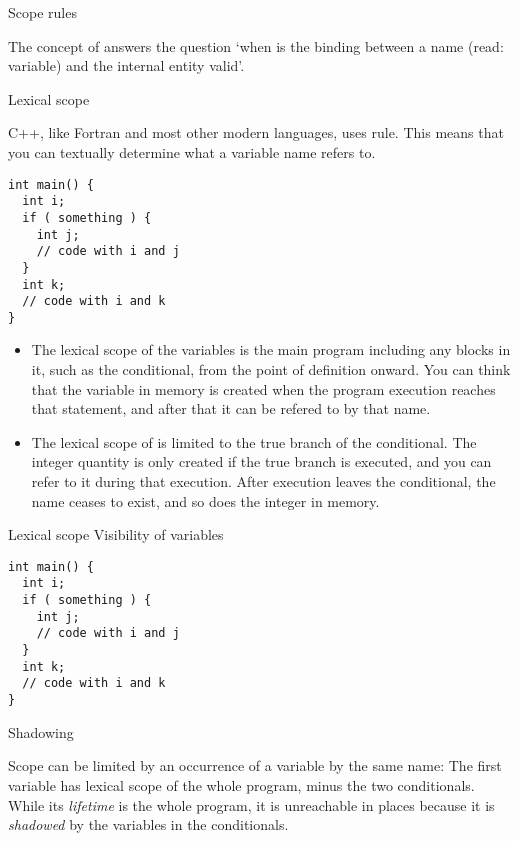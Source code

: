 
 {Scope rules}

The concept of  answers the question `when is the
binding between a name (read: variable) and the internal entity valid'.

 {Lexical scope}

C++, like Fortran and most other modern languages, uses
 rule. This means that you can textually
determine what a variable name refers to.
\begin{verbatim}
int main() {
  int i;
  if ( something ) {
    int j;
    // code with i and j
  }
  int k;
  // code with i and k
}
\end{verbatim}
\begin{itemize}
\item The lexical scope of the variables  is the main program
  including any blocks in it, such as the conditional, from the point
  of definition onward. You can think that the variable in memory is
  created when the program execution reaches that statement, and after
  that it can be refered to by that name.
\item The lexical scope of  is limited to the true branch of the
  conditional. The integer quantity is only created if the true branch
  is executed, and you can refer to it during that execution. After
  execution leaves the conditional, the name ceases to exist, and so
  does the integer in memory.
\end{itemize}

\begin{slide}{Lexical scope}
  \label{sl:lexical}
  Visibility of variables
\begin{verbatim}
int main() {
  int i;
  if ( something ) {
    int j;
    // code with i and j
  }
  int k;
  // code with i and k
}
\end{verbatim}  
\end{slide}

 {Shadowing}

Scope can be limited by an occurrence of a variable by the same name:
%
%
The first variable  has lexical scope of the whole program, minus
the two conditionals. While its
\emph{lifetime} is the whole program, it is
unreachable in places because it is
\emph{shadowed} by the variables  in the conditionals.

